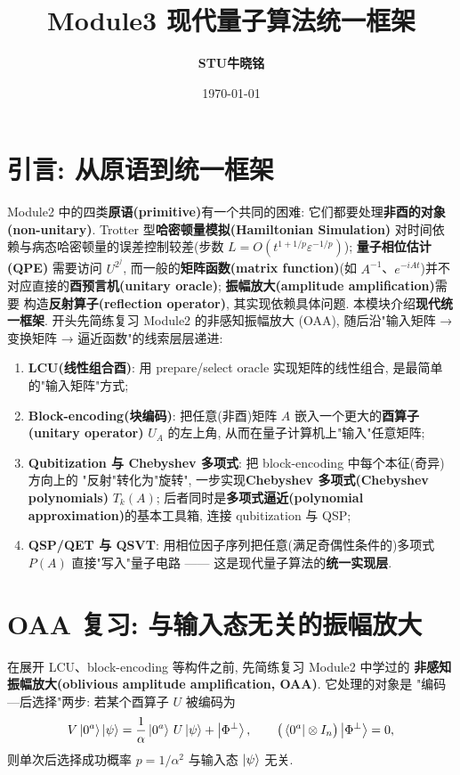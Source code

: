 \documentclass[utf8]{article} %
\title{\textbf{Module3 现代量子算法统一框架}}
\date{\today}
\author{\textbf{STU\quad 牛晓铭}}
\numberwithin{equation}{section}   %
\begin{document}
  
\maketitle
\renewcommand{\contentsname}{} 
\tableofcontents
\thispagestyle{empty}
	
\newpage
\setcounter{page}{1}

\section{引言: 从原语到统一框架}

Module2 中的四类\textbf{原语(primitive)}有一个共同的困难: 它们都要处理\textbf{非酉的对象(non-unitary)}. Trotter 型\textbf{哈密顿量模拟(Hamiltonian Simulation)}
对时间依赖与病态哈密顿量的误差控制较差(步数 $L = O(t^{1+1/p}\varepsilon^{-1/p})$); \textbf{量子相位估计(QPE)} 需要访问
$U^{2^j}$, 而一般的\textbf{矩阵函数(matrix function)}(如 $A^{-1}$、$e^{-iAt}$)并不对应直接的\textbf{酉预言机(unitary oracle)}; \textbf{振幅放大(amplitude amplification)}需要
构造\textbf{反射算子(reflection operator)}, 其实现依赖具体问题. 本模块介绍\textbf{现代统一框架}. 开头先简练复习 Module2 的非感知振幅放大 (OAA),
随后沿"输入矩阵 → 变换矩阵 → 逼近函数"的线索层层递进:

\begin{enumerate}
    \item \textbf{LCU(线性组合酉)}: 用 prepare/select oracle 实现矩阵的线性组合,
    是最简单的"输入矩阵"方式;
    \item \textbf{Block-encoding(块编码)}: 把任意(非酉)矩阵 $A$ 嵌入一个更大的\textbf{酉算子(unitary operator)}
    $U_A$ 的左上角, 从而在量子计算机上"输入"任意矩阵;
    \item \textbf{Qubitization 与 Chebyshev 多项式}: 把 block-encoding 中每个本征(奇异)方向上的
    "反射"转化为"旋转", 一步实现\textbf{Chebyshev 多项式(Chebyshev polynomials)} $T_k(A)$;
    后者同时是\textbf{多项式逼近(polynomial approximation)}的基本工具箱, 连接 qubitization 与 QSP;
    \item \textbf{QSP/QET 与 QSVT}: 用相位因子序列把任意(满足奇偶性条件的)多项式
    $P(A)$ 直接"写入"量子电路 —— 这是现代量子算法的\textbf{统一实现层}.
\end{enumerate}

\section{OAA 复习: 与输入态无关的振幅放大}

在展开 LCU、block-encoding 等构件之前, 先简练复习 Module2 中学过的
\textbf{非感知振幅放大(oblivious amplitude amplification, OAA)}. 它处理的对象是
"编码—后选择"两步: 若某个酉算子 $U$ 被编码为
\begin{equation}
    V\ket{0^a}\ket{\psi} = \frac{1}{\alpha}\ket{0^a}\, U\ket{\psi} + \ket{\Phi^\perp},
    \qquad \big(\bra{0^a}\otimes I_n\big)\ket{\Phi^\perp} = 0,
\end{equation}
则单次后选择成功概率 $p = 1/\alpha^2$ 与输入态 $\ket{\psi}$ 无关.
\end{document}
